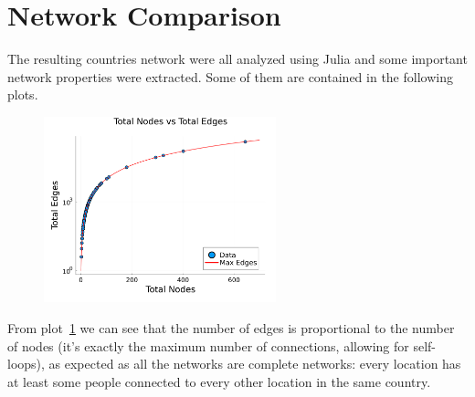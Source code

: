\section{Network Comparison}
The resulting countries network were all analyzed using Julia and some important network properties were extracted. Some of them are contained in the following plots.

\begin{figure}[H]
    \centering
    \includegraphics[width=0.6\textwidth]{images/task44/TotalNodesVsTotalEdges.png}
    \caption{}
    \label{fig:TotalNodesVsTotalEdges}
\end{figure}

From plot~\ref{fig:TotalNodesVsTotalEdges} we can see that the number of edges is proportional to the number of nodes (it's exactly the maximum number of connections, allowing for self-loops), as expected as all the networks are complete networks: every location has at least some people connected to every other location in the same country.


